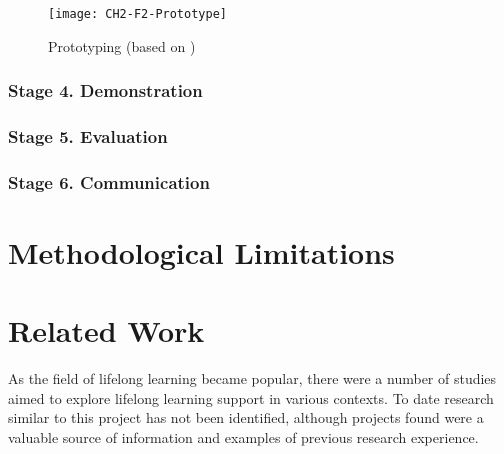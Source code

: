 \begin{figure}[htb]
\centering
\texttt{[image: CH2-F2-Prototype]}
\caption[Ptototyping]{Prototyping (based on \citet*[p.~411]{Sommerville2007})}
\label{fig:prototype}
\end{figure}

\subsubsection{Stage 4. Demonstration}

\subsubsection{Stage 5. Evaluation}

\subsubsection{Stage 6. Communication}

\section{Methodological Limitations}

\section{Related Work}
\label{sec:related}
As the field of lifelong learning became popular, there were a number of studies
aimed to explore lifelong learning support in various contexts. To date research
similar to this project has not been identified, although projects found were a
valuable source of information and examples of previous research experience.

